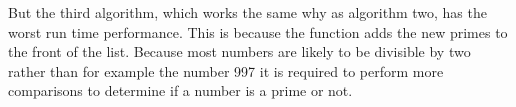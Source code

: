 \documentclass[a4paper,11pt]{article}
\begin{document}
But the third algorithm, which works the same why as algorithm two, has the worst run time performance. This is because the function adds the new primes to the front of the list. Because most numbers are likely to be divisible by two rather than for example the number 997 it is required to perform more comparisons to determine if a number is a prime or not.
\end{document}
